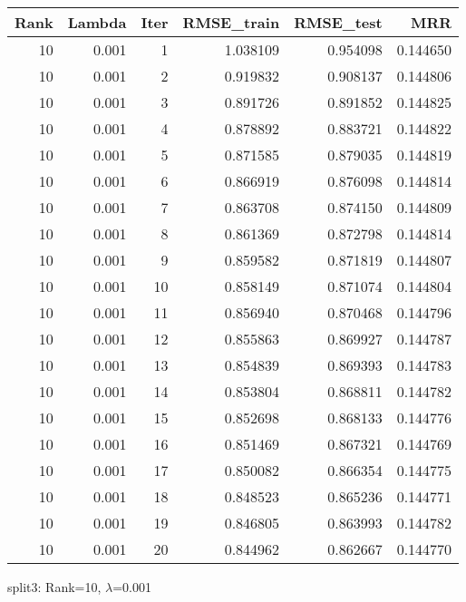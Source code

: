 \begin{tabular}{rrrrrr}
\toprule
 Rank &  Lambda &  Iter &  RMSE\_train &  RMSE\_test &       MRR \\
\midrule
   10 &   0.001 &     1 &    1.038109 &   0.954098 &  0.144650 \\
   10 &   0.001 &     2 &    0.919832 &   0.908137 &  0.144806 \\
   10 &   0.001 &     3 &    0.891726 &   0.891852 &  0.144825 \\
   10 &   0.001 &     4 &    0.878892 &   0.883721 &  0.144822 \\
   10 &   0.001 &     5 &    0.871585 &   0.879035 &  0.144819 \\
   10 &   0.001 &     6 &    0.866919 &   0.876098 &  0.144814 \\
   10 &   0.001 &     7 &    0.863708 &   0.874150 &  0.144809 \\
   10 &   0.001 &     8 &    0.861369 &   0.872798 &  0.144814 \\
   10 &   0.001 &     9 &    0.859582 &   0.871819 &  0.144807 \\
   10 &   0.001 &    10 &    0.858149 &   0.871074 &  0.144804 \\
   10 &   0.001 &    11 &    0.856940 &   0.870468 &  0.144796 \\
   10 &   0.001 &    12 &    0.855863 &   0.869927 &  0.144787 \\
   10 &   0.001 &    13 &    0.854839 &   0.869393 &  0.144783 \\
   10 &   0.001 &    14 &    0.853804 &   0.868811 &  0.144782 \\
   10 &   0.001 &    15 &    0.852698 &   0.868133 &  0.144776 \\
   10 &   0.001 &    16 &    0.851469 &   0.867321 &  0.144769 \\
   10 &   0.001 &    17 &    0.850082 &   0.866354 &  0.144775 \\
   10 &   0.001 &    18 &    0.848523 &   0.865236 &  0.144771 \\
   10 &   0.001 &    19 &    0.846805 &   0.863993 &  0.144782 \\
   10 &   0.001 &    20 &    0.844962 &   0.862667 &  0.144770 \\
\bottomrule
\end{tabular}

\caption{split3: Rank=10, $\lambda$=0.001}
